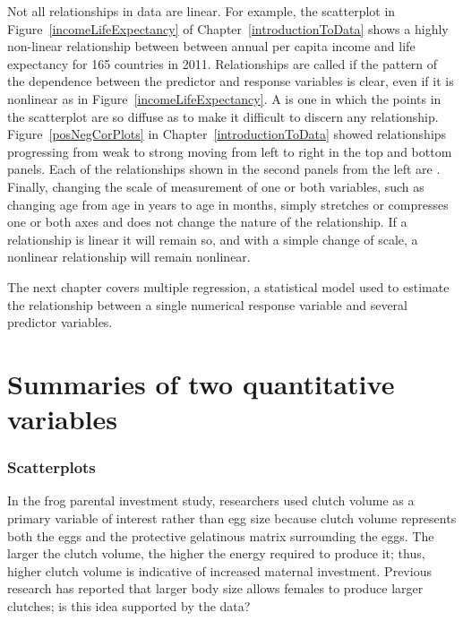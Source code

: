 {Not all relationships in data are linear.  For example, the scatterplot in Figure~\ref{incomeLifeExpectancy} of Chapter~\ref{introductionToData} shows a highly non-linear relationship between between annual per capita income and life expectancy for 165 countries in 2011.  Relationships are called  if the pattern of the dependence between the predictor and response variables is clear, even if it is nonlinear as in Figure~\ref{incomeLifeExpectancy}.  A  is one in which the points in the scatterplot are so diffuse as to make it difficult to discern any relationship.  Figure~\ref{posNegCorPlots} in Chapter~\ref{introductionToData} showed relationships progressing from weak to strong moving from left to right in the top and bottom panels.  Each of the relationships shown in the second panels from the left are .  Finally, changing the scale of measurement of one or both variables, such as changing age from age in years to age in months, simply stretches or compresses one or both axes and does not change the nature of the relationship.  If a relationship is linear it will remain so, and with a simple change of scale, a nonlinear relationship will remain nonlinear.

\textD{\newpage}

The next chapter covers multiple regression, a statistical model used to estimate the relationship between a single numerical response variable and several predictor variables.}




\section{Summaries of two quantitative variables}
\subsubsection{Scatterplots}
\label{scatterPlots}

In the frog parental investment study, researchers used clutch volume as a primary variable of interest rather than egg size because clutch volume represents both the eggs and the protective gelatinous matrix surrounding the eggs. The larger the clutch volume, the higher the energy required to produce it; thus, higher clutch volume is indicative of increased maternal investment. Previous research has reported that larger body size allows females to produce larger clutches; is this idea supported by the  data?

